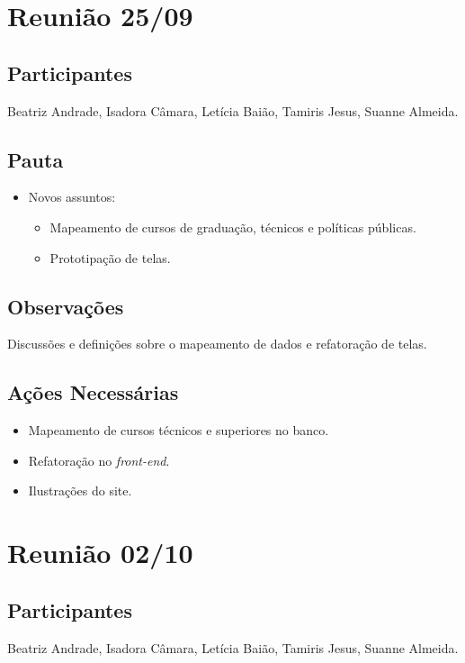 \begin{apendicesenv}
\section*{Reunião 25/09}

\subsection*{Participantes}
Beatriz Andrade, Isadora Câmara, Letícia Baião, Tamiris Jesus, Suanne Almeida.

\subsection*{Pauta}
\begin{itemize}
    \item Novos assuntos:
    \begin{itemize}
        \item Mapeamento de cursos de graduação, técnicos e políticas públicas.
        \item Prototipação de telas.
    \end{itemize}
\end{itemize}

\subsection*{Observações}
 Discussões e definições sobre o mapeamento de dados e refatoração de telas.

\subsection*{Ações Necessárias}
\begin{itemize}
    \item Mapeamento de cursos técnicos e superiores no banco.
    \item Refatoração no \textit{front-end}.
    \item Ilustrações do site.
\end{itemize}

\section*{Reunião 02/10}

\subsection*{Participantes}
Beatriz Andrade, Isadora Câmara, Letícia Baião, Tamiris Jesus, Suanne Almeida.


\end{apendicesenv}
